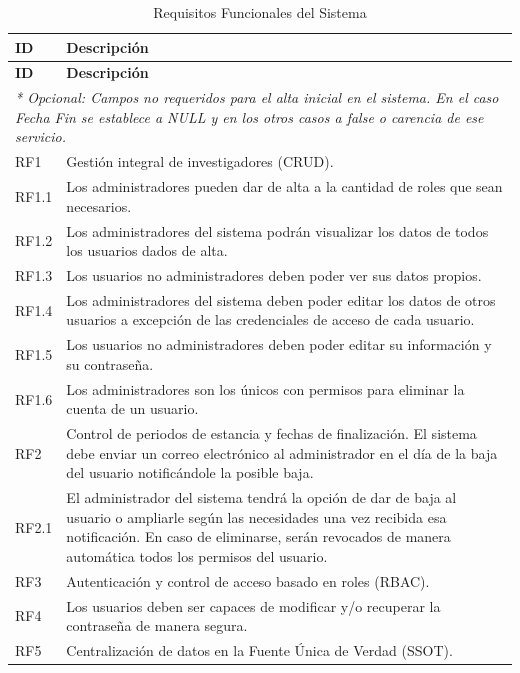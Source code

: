 \begin{longtable}{l p{}} %
\caption{Requisitos Funcionales del Sistema}
\label{tab:rf_inc2} \\
\toprule
\textbf{ID} & \textbf{Descripción} \\
\midrule
\endfirsthead

\toprule
\textbf{ID} & \textbf{Descripción} \\
\midrule
\endhead

\bottomrule
\multicolumn{2}{p{\textwidth}}{\footnotesize \textit{* Opcional: Campos no requeridos para el alta inicial en el sistema. En el caso Fecha Fin se establece a NULL y en los otros casos a false o carencia de ese servicio.}} \\
\endfoot

RF1   & Gestión integral de investigadores (CRUD). \\
RF1.1 & Los administradores pueden dar de alta a la cantidad de roles que sean necesarios. \\
RF1.2 & Los administradores del sistema podrán visualizar los datos de todos los usuarios dados de alta. \\
RF1.3 & Los usuarios no administradores deben poder ver sus datos propios. \\
RF1.4 & Los administradores del sistema deben poder editar los datos de otros usuarios a excepción de las credenciales de acceso de cada usuario. \\
RF1.5 & Los usuarios no administradores deben poder editar su información y su contraseña. \\
RF1.6 & Los administradores son los únicos con permisos para eliminar la cuenta de un usuario. \\
RF2   & Control de periodos de estancia y fechas de finalización. El sistema debe enviar un correo electrónico al administrador en el día de la baja del usuario notificándole la posible baja. \\
RF2.1 & El administrador del sistema tendrá la opción de dar de baja al usuario o ampliarle según las necesidades una vez recibida esa notificación. En caso de eliminarse, serán revocados de manera automática todos los permisos del usuario.\\
RF3   & Autenticación y control de acceso basado en roles (RBAC). \\
RF4   & Los usuarios deben ser capaces de modificar y/o recuperar la contraseña de manera segura. \\
RF5   & Centralización de datos en la Fuente Única de Verdad (SSOT). \\

\end{longtable}
